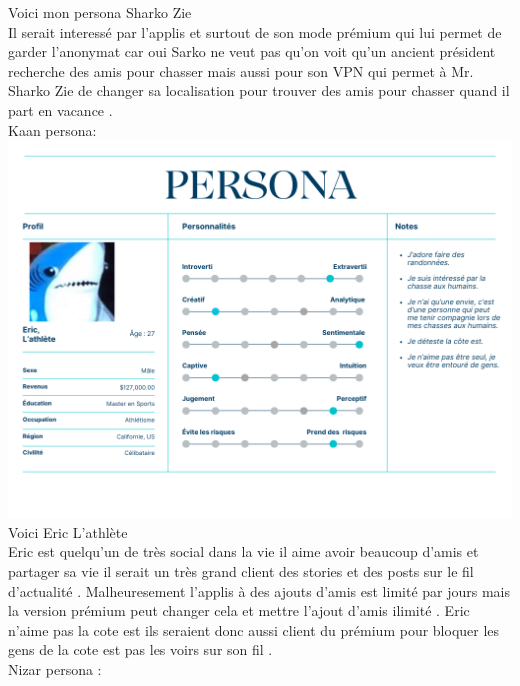 \documentclass{article}
\begin{document}
Voici mon persona Sharko Zie \\

Il serait interessé par l'applis et surtout de son mode prémium qui lui permet de garder l'anonymat
car oui Sarko ne veut pas qu'on voit qu'un ancient président recherche des amis pour chasser mais aussi
pour son VPN qui permet à Mr. Sharko Zie de changer sa localisation pour trouver des amis pour chasser
quand il part en vacance . \\

Kaan persona:\\

\includegraphics[width=1\textwidth]{photo/Personna_Kaan.png}\\

Voici Eric L'athlète\\

Eric est quelqu'un de très social dans la vie il aime avoir beaucoup d'amis et partager sa vie il serait 
un très grand client des stories et des posts sur le fil d'actualité .  Malheuresement l'applis à des ajouts 
d'amis est limité par jours mais la version prémium peut changer cela et mettre l'ajout d'amis ilimité . 
Eric n'aime pas la cote est ils seraient donc aussi client du prémium pour bloquer les gens de la cote est 
pas les voirs sur son fil .\\


Nizar persona : 
\end{document}
